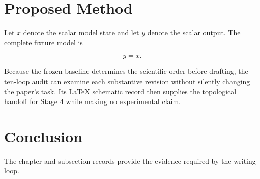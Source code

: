 \documentclass{article}
\begin{document}
\section{Proposed Method}

Let $x$ denote the scalar model state and let $y$ denote the scalar output. The
complete fixture model is

\begin{equation}
  y=x.
  \label{eq:writing-loop-fixture}
\end{equation}

Because the frozen baseline determines the scientific order before drafting,
the ten-loop audit can examine each substantive revision without silently
changing the paper's task. Its LaTeX schematic record then supplies the
topological handoff for Stage 4 while making no experimental claim.

\section{Conclusion}

The chapter and subsection records provide the evidence required by the
writing loop.
\end{document}
